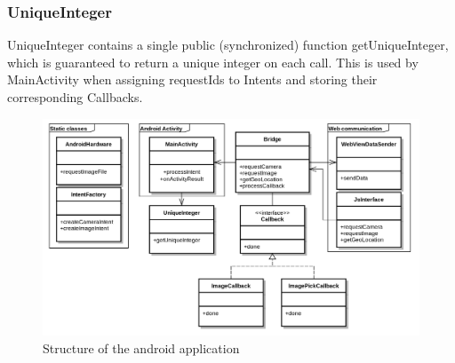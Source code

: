 \subsubsection{UniqueInteger} 
UniqueInteger contains a single public (synchronized) function getUniqueInteger, which is guaranteed to return a unique integer on each call. This is used by MainActivity when assigning requestIds to Intents and storing their corresponding Callbacks.

\begin{figure}[h!]
	\centering
    \includegraphics[width=120mm,natwidth=800,natheight=600]{./img/polluxuml.png}
    \caption{Structure of the android application}
    \label{fig:nativeuml}
\end{figure}

